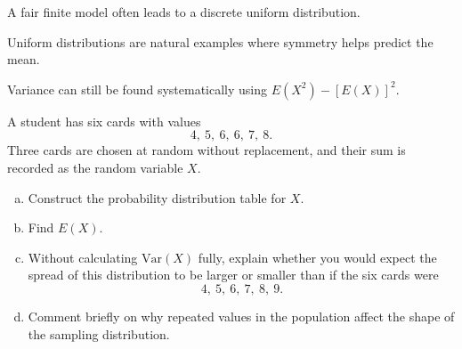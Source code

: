 \begin{takeaways}
\item A fair finite model often leads to a discrete uniform distribution.
\item Uniform distributions are natural examples where symmetry helps predict the mean.
\item Variance can still be found systematically using $E(X^2)-[E(X)]^2$.
\end{takeaways}

\begin{problem}
A student has six cards with values
\[
4,\ 5,\ 6,\ 6,\ 7,\ 8.
\]
Three cards are chosen at random without replacement, and their sum is recorded as the random variable $X$.
\begin{enumerate}[(a)]
  \item Construct the probability distribution table for $X$.
  \item Find $E(X)$.
  \item Without calculating $\mathrm{Var}(X)$ fully, explain whether you would expect the spread of this distribution to be larger or smaller than if the six cards were
  \[
  4,\ 5,\ 6,\ 7,\ 8,\ 9.
  \]
  \item Comment briefly on why repeated values in the population affect the shape of the sampling distribution.
\end{enumerate}
\end{problem}

